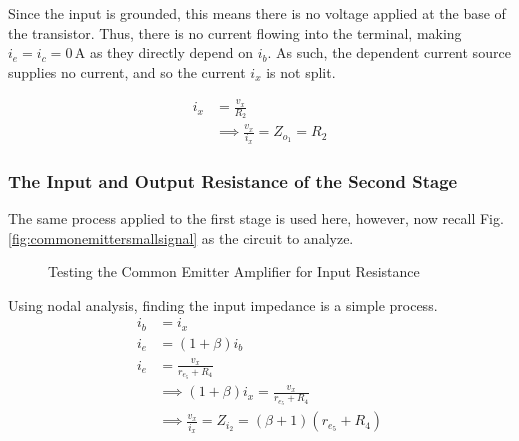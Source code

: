 \documentclass[lettersize,journal]{IEEEtran}
\begin{document}
Since the input is grounded, this means there is no voltage applied at the 
base of the transistor. Thus, there is no current flowing into the terminal, 
making $i_e = i_c = 0\,\text{A}$ as they directly depend on $i_b$. As such, the 
dependent current source supplies no current, and so the current $i_x$ is not 
split. 

\IEEEpubidadjcol

\begin{align}
  i_x &= \frac{v_x}{R_2} \\[1ex]
      &\implies \frac{v_x}{i_x} = Z_{o_1} = R_2
\end{align}

\subsubsection{The Input and Output Resistance of the Second Stage}
The same process applied to the first stage is used here, however, 
now recall Fig. \ref{fig:commonemittersmallsignal} as the circuit to 
analyze.

\begin{figure}[H]
  \centering
  \caption{Testing the Common Emitter Amplifier for Input Resistance}
  \label{fig:commonemitterinputresist}
\end{figure}

Using nodal analysis, finding the input impedance is a simple process.
\begin{align}
  i_b &= i_x \\[1ex]
  i_e &= (1+\beta) i_b \\[1ex]
  i_e &= \frac{v_x}{r_{e_5}+R_4} \\[1ex]
      &\implies (1+\beta)i_x = \frac{v_x}{r_{e_5} + R_4} \\[1ex]
      &\implies \frac{v_x}{i_x} = Z_{i_2} = (\beta+1)(r_{e_5} + R_4)  
\end{align}
\end{document}
